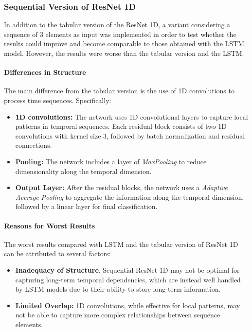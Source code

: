\documentclass[a4paper,final,12pt]{report}
\begin{document}
\subsubsection{Sequential Version of ResNet 1D}
In addition to the tabular version of the ResNet 1D, a variant considering a sequence of 3 elements as input was implemented in order to test whether the results could improve and become comparable to those obtained with the LSTM model. However, the results were worse than the tabular version and the LSTM.

\paragraph{Differences in Structure}
The main difference from the tabular version is the use of 1D convolutions to process time sequences. Specifically:
\begin{itemize}
    \item \textbf{1D convolutions:} The network uses 1D convolutional layers to capture local patterns in temporal sequences. Each residual block consists of two 1D convolutions with kernel size 3, followed by batch normalization and residual connections.
    \item \textbf{Pooling:} The network includes a layer of \textit{MaxPooling} to reduce dimensionality along the temporal dimension.
    \item \textbf{Output Layer:} After the residual blocks, the network uses a \textit{Adaptive Average Pooling} to aggregate the information along the temporal dimension, followed by a linear layer for final classification.
\end{itemize}

\paragraph{Reasons for Worst Results}
The worst results compared with LSTM and the tabular version of ResNet 1D can be attributed to several factors:
\begin{itemize}
    \item \textbf{Inadequacy of Structure}. Sequential ResNet 1D may not be optimal for capturing long-term temporal dependencies, which are instead well handled by LSTM models due to their ability to store long-term information.
    \item \textbf{Limited Overlap:} 1D convolutions, while effective for local patterns, may not be able to capture more complex relationships between sequence elements.
\end{itemize}
\end{document}
